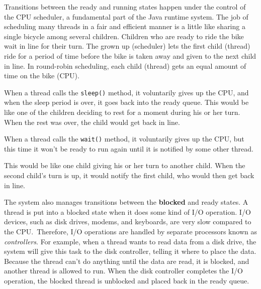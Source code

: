 Transitions between the ready and running states happen under the
control of the CPU scheduler, a fundamental part of the Java runtime
system.  The job of scheduling many threads in a fair and
efficient manner is a little like sharing a single bicycle among
several children.   Children who are ready to ride the bike wait in line
for their turn.  The grown up (scheduler) lets the first child (thread)
ride for a period of time before the bike is taken away and given to
the next child in line.  In round-robin scheduling, each child (thread)
gets an equal amount of time on the bike (CPU).

When a thread calls the {\tt sleep()} method, it voluntarily gives up
the CPU, and when the sleep period is over, it goes back into the
ready queue.   This would be like one of the children deciding to rest
for a moment during his or her turn.   When the rest was over, the
child would get back in line.

When a thread calls the {\tt wait()} method, it voluntarily gives up
the CPU, but this time it won't be ready to run again until it is
notified by some other thread.

This would be like one child giving his
or her turn to another child.  When the second child's turn is up, it
would notify the first child, who would then get back in line.

The system also manages transitions between the {\bf blocked} and
ready states.  A thread is put into a blocked state when it does some
kind of I/O operation.  I/O devices, such as disk drives, modems, and
keyboards, are very slow compared to the CPU.~Therefore, I/O
operations are handled by separate processors known as {\it
controllers}. For example, when a thread wants to read data from a
disk drive, the system will give this task to the disk controller,
telling it where to place the data.  Because the thread can't do anything
until the data are read, it is blocked, and another thread is allowed
to run.   When the disk controller completes the I/O operation, the
blocked thread is unblocked and placed back in the ready queue.

